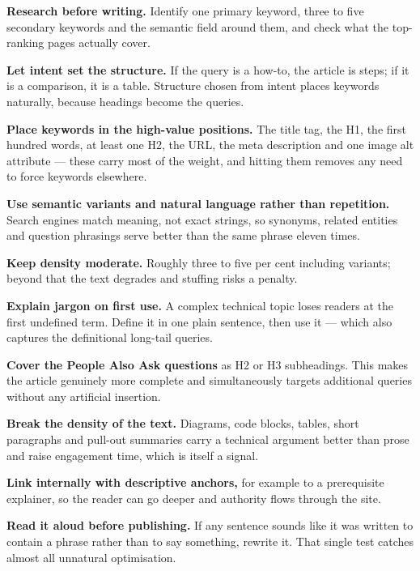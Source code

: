 \begin{qlist}
\begin{apts}
\item \textbf{Research before writing.} Identify one primary keyword, three to
      five secondary keywords and the semantic field around them, and check what
      the top-ranking pages actually cover.
\item \textbf{Let intent set the structure.} If the query is a how-to, the
      article is steps; if it is a comparison, it is a table. Structure chosen
      from intent places keywords naturally, because headings become the
      queries.
\item \textbf{Place keywords in the high-value positions.} The title tag, the
      H1, the first hundred words, at least one H2, the URL, the meta
      description and one image alt attribute --- these carry most of the
      weight, and hitting them removes any need to force keywords elsewhere.
\item \textbf{Use semantic variants and natural language rather than repetition.}
      Search engines match meaning, not exact strings, so synonyms, related
      entities and question phrasings serve better than the same phrase eleven
      times.
\item \textbf{Keep density moderate.} Roughly three to five per cent including
      variants; beyond that the text degrades and stuffing risks a penalty.
\item \textbf{Explain jargon on first use.} A complex technical topic loses
      readers at the first undefined term. Define it in one plain sentence, then
      use it --- which also captures the definitional long-tail queries.
\item \textbf{Cover the People Also Ask questions} as H2 or H3 subheadings.
      This makes the article genuinely more complete and simultaneously targets
      additional queries without any artificial insertion.
\item \textbf{Break the density of the text.} Diagrams, code blocks, tables,
      short paragraphs and pull-out summaries carry a technical argument better
      than prose and raise engagement time, which is itself a signal.
\item \textbf{Link internally with descriptive anchors,} for example to a
      prerequisite explainer, so the reader can go deeper and authority flows
      through the site.
\item \textbf{Read it aloud before publishing.} If any sentence sounds like it
      was written to contain a phrase rather than to say something, rewrite it.
      That single test catches almost all unnatural optimisation.
\end{apts}


\end{qlist}
